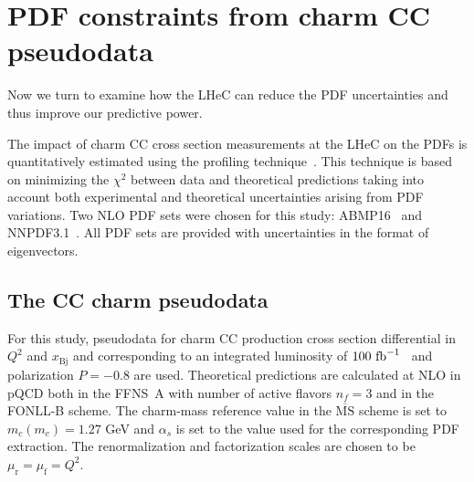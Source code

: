 \documentclass[pdftex,twocolumn,epjc3]{svjour3}          %
\newcommand{\abmp} {ABMP16\xspace}
\newcommand{\nnpdf} {NNPDF3.1\xspace}
\newcommand{\chisq}{\ensuremath{\chi^2}\xspace}
\newcommand{\xbj}{\ensuremath{x_{\text{Bj}}}\xspace}
\newcommand{\fonll} {{FONLL-B}\xspace}
\newcommand{\ffns} {{FFNS~A}\xspace}
\begin{document}
\section{PDF constraints from charm CC pseudodata}
\label{sec:PDF}

Now we turn to examine how the LHeC can reduce the PDF uncertainties
and thus improve our predictive power.

The impact of charm CC cross section measurements at the LHeC on the
PDFs is quantitatively estimated using the profiling
technique~\cite{Paukkunen:2014zia}. This technique is based on
minimizing the \chisq between data and theoretical predictions taking
into account both experimental and theoretical uncertainties arising
from PDF variations.
%
Two NLO PDF sets were chosen for this study:
\abmp~\cite{Alekhin:2018pai} and \nnpdf~\cite{Ball:2017nwa}. All PDF sets are provided with
uncertainties in the format of eigenvectors.

\subsection{The CC  charm pseudodata}
\label{sec:pseudodata}

For this study, pseudodata for charm CC production cross section
differential in $Q^2$ and \xbj and corresponding to an integrated
luminosity of $100{\rm~fb}^{-1}$~\cite{AbelleiraFernandez:2012cc,Blumlein:1992we} and
polarization $P=-0.8$ are used.
%
%
Theoretical predictions are calculated at NLO
in pQCD both in the \ffns with number of active flavors $n_f = 3$ and
in the \fonll scheme. The charm-mass reference value in the
$\overline{\mbox{MS}}$ scheme is set to $m_c(m_c) = 1.27$ GeV and
$\alpha_s$ is set to the value used for the corresponding PDF
extraction. The renormalization and factorization scales are chosen to
be $\mu_\mathrm{r} = \mu_\mathrm{f} = Q^2$.
\end{document}
